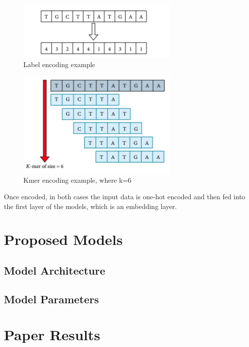 \documentclass[journal]{IEEEtran}
\begin{document}
\begin{figure}[h]
  \centering
  \includegraphics[width=8cm]{figures/label_encoding.png}
  \caption{Label encoding example}
\end{figure}

\begin{figure}[h]
  \centering
  \includegraphics[width=8cm]{figures/kmer_encoding.png}
  \caption{Kmer encoding example, where k=6}
\end{figure}

Once encoded, in both cases the input data is one-hot encoded and then fed into
the first layer of the models, which is an embedding layer.

\section{Proposed Models}
\lipsum[1] %

\subsection{Model Architecture}
\lipsum[1] %

\subsection{Model Parameters}
\lipsum[1] %

\section{Paper Results}
\lipsum[1] %
\end{document}
